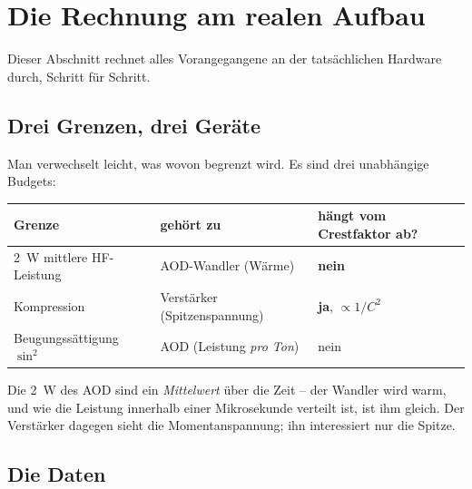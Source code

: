 \documentclass[11pt,a4paper]{article}
\newcommand{\crest}{\ensuremath{C}}
\begin{document}
\section{Die Rechnung am realen Aufbau}\label{sec:realsetup}

Dieser Abschnitt rechnet alles Vorangegangene an der tatsächlichen Hardware
durch, Schritt für Schritt.

\subsection{Drei Grenzen, drei Geräte}

Man verwechselt leicht, was wovon begrenzt wird. Es sind drei unabhängige
Budgets:

\begin{center}
\begin{tabular}{lll}
  \toprule
  Grenze & gehört zu & hängt vom Crestfaktor ab?\\
  \midrule
  \SI{2}{\watt} mittlere HF-Leistung & AOD-Wandler (Wärme) & \textbf{nein}\\
  Kompression & Verstärker (Spitzenspannung) & \textbf{ja}, $\propto 1/\crest^2$\\
  Beugungssättigung $\sin^2$ & AOD (Leistung \emph{pro Ton}) & nein\\
  \bottomrule
\end{tabular}
\end{center}

Die \SI{2}{\watt} des AOD sind ein \emph{Mittelwert} über die Zeit -- der
Wandler wird warm, und wie die Leistung innerhalb einer Mikrosekunde verteilt
ist, ist ihm gleich. Der Verstärker dagegen sieht die Momentanspannung; ihn
interessiert nur die Spitze.

\subsection{Die Daten}
\end{document}
